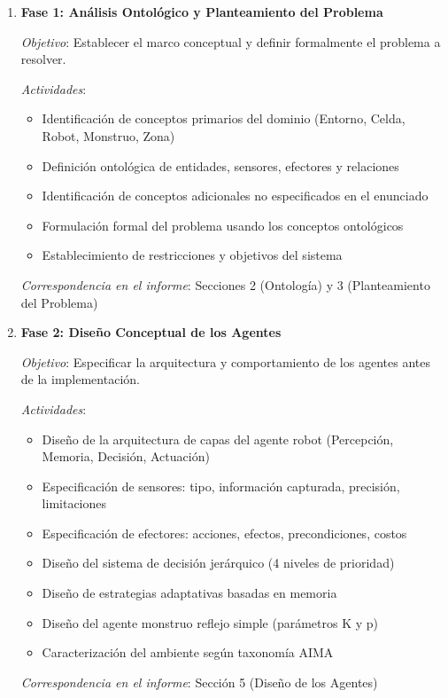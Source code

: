 \documentclass[10pt,twocolumn]{article}
\begin{document}
\begin{enumerate}
\item \textbf{Fase 1: Análisis Ontológico y Planteamiento del Problema}

\textit{Objetivo}: Establecer el marco conceptual y definir formalmente el problema a resolver.

\textit{Actividades}:
\begin{itemize}
\item Identificación de conceptos primarios del dominio (Entorno, Celda, Robot, Monstruo, Zona)
\item Definición ontológica de entidades, sensores, efectores y relaciones
\item Identificación de conceptos adicionales no especificados en el enunciado
\item Formulación formal del problema usando los conceptos ontológicos
\item Establecimiento de restricciones y objetivos del sistema
\end{itemize}

\textit{Correspondencia en el informe}: Secciones 2 (Ontología) y 3 (Planteamiento del Problema)

\item \textbf{Fase 2: Diseño Conceptual de los Agentes}

\textit{Objetivo}: Especificar la arquitectura y comportamiento de los agentes antes de la implementación.

\textit{Actividades}:
\begin{itemize}
\item Diseño de la arquitectura de capas del agente robot (Percepción, Memoria, Decisión, Actuación)
\item Especificación de sensores: tipo, información capturada, precisión, limitaciones
\item Especificación de efectores: acciones, efectos, precondiciones, costos
\item Diseño del sistema de decisión jerárquico (4 niveles de prioridad)
\item Diseño de estrategias adaptativas basadas en memoria
\item Diseño del agente monstruo reflejo simple (parámetros K y p)
\item Caracterización del ambiente según taxonomía AIMA
\end{itemize}

\textit{Correspondencia en el informe}: Sección 5 (Diseño de los Agentes)


\end{enumerate}
\end{document}

